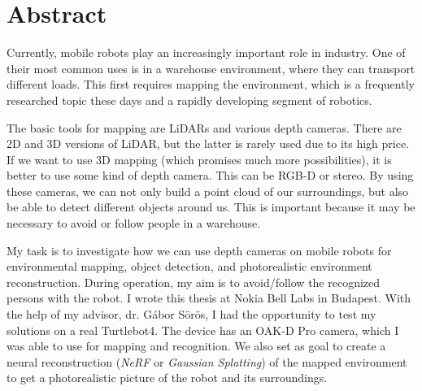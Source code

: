 \chapter*{Abstract}
Currently, mobile robots play an increasingly important role in industry. One of their most common uses is in a warehouse environment, where they can transport different loads. This first requires mapping the environment, which is a frequently researched topic these days and a rapidly developing segment of robotics.

The basic tools for mapping are LiDARs and various depth cameras. There are 2D and 3D versions of LiDAR, but the latter is rarely used due to its high price. If we want to use 3D mapping (which promises much more possibilities), it is better to use some kind of depth camera. This can be RGB-D or stereo. By using these cameras, we can not only build a point cloud of our surroundings, but also be able to detect different objects around us. This is important because it may be necessary to avoid or follow people in a warehouse.

My task is to investigate how we can use depth cameras on mobile robots for environmental mapping, object detection, and photorealistic environment reconstruction. During operation, my aim is to avoid/follow the recognized persons with the robot. I wrote this thesis at Nokia Bell Labs in Budapest. With the help of my advisor, dr. Gábor Sörös, I had the opportunity to test my solutions on a real Turtlebot4. The device has an OAK-D Pro camera, which I was able to use for mapping and recognition. We also set as goal to create a neural reconstruction (\textit {NeRF} or \textit{Gaussian Splatting}) of the mapped environment to get a photorealistic picture of the robot and its surroundings.

\vfill
\selectthesislanguage

\setcounter{romanPage}{\value{page}}
